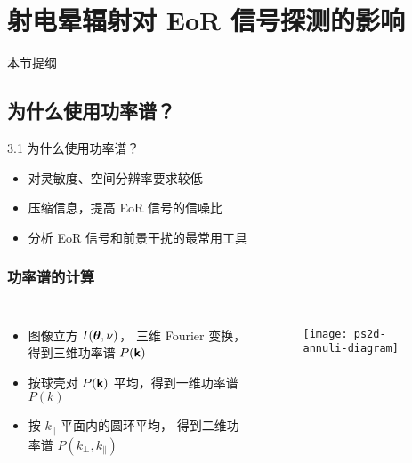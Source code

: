 \documentclass{beamer}
\begin{document}
\section{射电晕辐射对 EoR 信号探测的影响}

\begin{frame}
  \begin{block}{本节提纲}
    \vspace{2ex}
    \tableofcontents[
      sections=\value{section},
      sectionstyle=hide,
    ]
  \end{block}
\end{frame}

\subsection{为什么使用功率谱？}

\begin{frame}{3.1 为什么使用功率谱？}
  \begin{itemize}
    \item 对灵敏度、空间分辨率要求较低
    \item 压缩信息，提高 EoR 信号的信噪比
    \item 分析 EoR 信号和前景干扰的最常用工具
  \end{itemize}
\end{frame}

\begin{frame}[subsec]
  \frametitle{功率谱的计算}
  \begin{columns}[t,onlytextwidth]
    \begin{itemize}
      \item \alert{图像立方} $I(\bm{\mathsf{\theta}}, \nu)$，
        三维 Fourier 变换，得到\alert{三维功率谱} $P(\bm{\mathsf{k}})$
      \item 按球壳对 $P(\bm{\mathsf{k}})$ 平均，得到\alert{一维功率谱} $P(k)$
      \item 按 $k_{\parallel}$ 平面内的圆环平均，
        得到\alert{二维功率谱} $P(k_{\perp}, k_{\parallel})$
    \end{itemize}

    \begin{figure}
      \centering
      \texttt{[image: ps2d-annuli-diagram]}
    \end{figure}
  \end{columns}
\end{frame}
\end{document}
